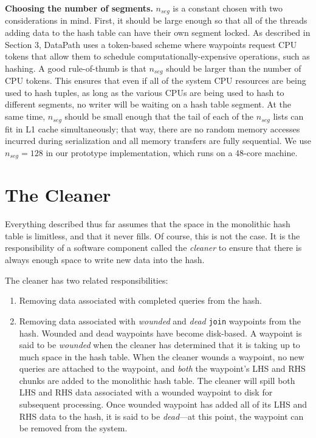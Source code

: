 \documentclass{sig-alternate}
\renewcommand\:{\colon} %
\begin{document}
\vspace{5 pt}
\noindent
\textbf{Choosing the number of segments.}
$n_{seg}$ is a constant chosen with two considerations in mind.  First, it should be large enough so that all of the threads
adding data to the hash table can have their own segment locked.  As described in Section 3,
DataPath uses a token-based scheme where waypoints request CPU
tokens that allow them to schedule computationally-expensive operations, such as hashing.  A good rule-of-thumb is that $n_{seg}$
should be larger than the number of CPU tokens.  This ensures that even if all of the system CPU resources are being used to hash tuples,
as long as the various CPUs are being used to hash to different segments, no writer will be waiting on a hash table segment.
At the same time, $n_{seg}$ should be small enough
that the tail of each of the $n_{seg}$ lists can fit in L1 cache simultaneously; that way, there are no random memory accesses 
incurred during serialization and all memory transfers are fully sequential. We use $n_{seg} = 128$ in our 
prototype implementation, which runs on a 48-core machine.  

\section{The Cleaner}

Everything described thus far assumes that the space in the monolithic hash table is limitless, and that it never fills.
Of course, this is not the case.  It is the responsibility of a software component called 
the \emph{cleaner} to ensure that there is always enough
space to write new data into the hash.

The cleaner has two related responsibilities:

\begin{enumerate}

\item Removing data associated with completed queries from the hash.

\item Removing data associated with \emph{wounded} and \emph{dead}
\texttt{join} waypoints from the hash.  Wounded and dead waypoints have become
disk-based.  A waypoint is said to be \emph{wounded} when the cleaner has determined
that it is taking up to much space in the hash table.  When the cleaner wounds a waypoint, no new queries
are attached to the waypoint, and \emph{both} the waypoint's LHS and RHS chunks are added to the monolithic
hash table.  The cleaner will spill both LHS and RHS data associated with a wounded waypoint to disk for subsequent processing.
Once wounded waypoint has added all of its LHS and RHS data to the hash, it is said to be \emph{dead}---at this point,
the waypoint can be removed from the system.

\end{enumerate}
\end{document}
